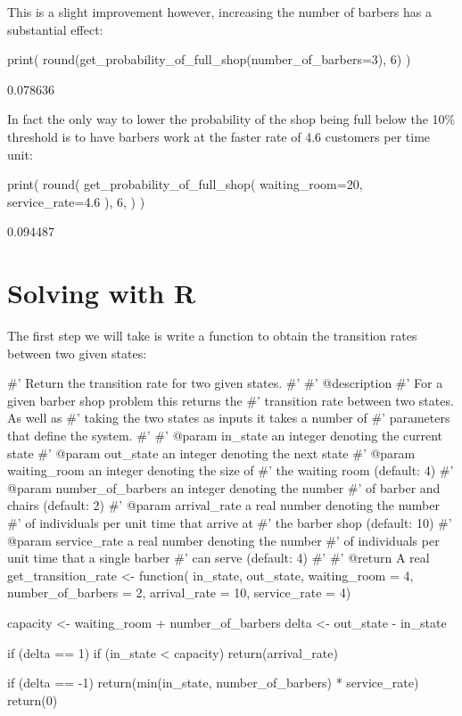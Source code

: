 This is a slight improvement however, increasing the number of barbers has a
substantial effect:

\begin{pyin}
print(
    round(get_probability_of_full_shop(number_of_barbers=3), 6)
)
\end{pyin}

\begin{pyout}
0.078636
\end{pyout}

In fact the only way to lower the probability of the shop being full below the
10\% threshold is to have barbers work at the faster rate of 4.6 customers per
time unit:

\begin{pyin}
print(
    round(
        get_probability_of_full_shop(
            waiting_room=20, service_rate=4.6
        ),
        6,
    )
)
\end{pyin}

\begin{pyout}
0.094487
\end{pyout}


\section{Solving with R}\label{sec:solving-with-R}

The first step we will take is write a function to obtain the transition rates
between two given states:

\begin{Rin}
#' Return the transition rate for two given states.
#'
#' @description
#' For a given barber shop problem this returns the
#' transition rate between two states. As well as
#' taking the two states as inputs it takes a number of
#' parameters that define the system.
#'
#' @param in_state an integer denoting the current state
#' @param out_state an integer denoting the next state
#' @param waiting_room an integer denoting the size of
#'        the waiting room (default: 4)
#' @param number_of_barbers an integer denoting the number
#'        of barber and chairs (default: 2)
#' @param arrival_rate a real number denoting the number
#'        of individuals per  unit time that arrive at
#'        the barber shop (default: 10)
#' @param service_rate a real number denoting the number
#'        of individuals per unit time that a single barber
#'        can serve (default: 4)
#'
#' @return A real
get_transition_rate <- function(
                                in_state,
                                out_state,
                                waiting_room = 4,
                                number_of_barbers = 2,
                                arrival_rate = 10,
                                service_rate = 4) {
  capacity <- waiting_room + number_of_barbers
  delta <- out_state - in_state

  if (delta == 1) {
    if (in_state < capacity) {
      return(arrival_rate)
    }
  }

  if (delta == -1) {
    return(min(in_state, number_of_barbers) * service_rate)
  }
  return(0)
}
\end{Rin}

